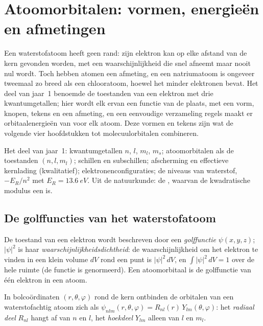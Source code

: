 \chapter{Atoomorbitalen: vormen, energieën en afmetingen}\label{ch:b2:atomic-orbitals}

Een waterstofatoom heeft geen rand: zijn elektron kan op elke afstand van de kern
gevonden worden, met een waarschijnlijkheid die snel afneemt maar nooit nul
wordt. Toch hebben atomen een afmeting, en een natriumatoom is ongeveer tweemaal zo breed als een
chlooratoom, hoewel het minder elektronen bevat. Het deel van jaar~1 benoemde de
toestanden van een elektron met drie kwantumgetallen; hier wordt elk ervan een
functie van de plaats, met een vorm, knopen, tekens en een afmeting, en een eenvoudige verzameling
regels maakt er orbitaalenergieën van voor elk atoom. Deze vormen en tekens
zijn wat de volgende vier hoofdstukken tot molecuulorbitalen combineren.

\begin{recall}
Het deel van jaar~1: kwantumgetallen $n$, $l$, $m_l$, $m_s$; atoomorbitalen als de
toestanden $(n, l, m_l)$; schillen en subschillen; afscherming en effectieve kernlading
(kwalitatief); elektronenconfiguraties; de niveaus van waterstof,
$-E_R/n^2$ met $E_R = \qty{13.6}{eV}$. Uit de natuurkunde: de , waarvan de
kwadratische modulus een  is.
\end{recall}

\section{De golffuncties van het waterstofatoom}

\begin{definition}[Golffunctie]\label{def:b2:atomic-orbitals:wavefunction}
De toestand van een elektron wordt beschreven door een \emph{golffunctie}
$\psi(x, y, z)$; $|\psi|^2$ is haar \emph{waarschijnlijkheidsdichtheid}:
de waarschijnlijkheid om het elektron te vinden in een klein volume $dV$ rond
een punt is $|\psi|^2\,dV$, en $\int|\psi|^2\,dV = 1$ over de hele ruimte (de functie
is genormeerd). Een atoomorbitaal is de golffunctie van één elektron in een
atoom.
\end{definition}

\begin{definition}\label{def:b2:atomic-orbitals:radial-angular}
In bolcoördinaten $(r, \theta, \varphi)$ rond de kern ontbinden de orbitalen van
een waterstofachtig atoom zich als $\psi_{nlm}(r, \theta, \varphi) = R_{nl}(r)\,
Y_{lm}(\theta, \varphi)$: het \emph{radiaal deel} $R_{nl}$ hangt af
van $n$ en $l$, het \emph{hoekdeel} $Y_{lm}$ alleen van $l$ en
$m_l$.
\end{definition}

